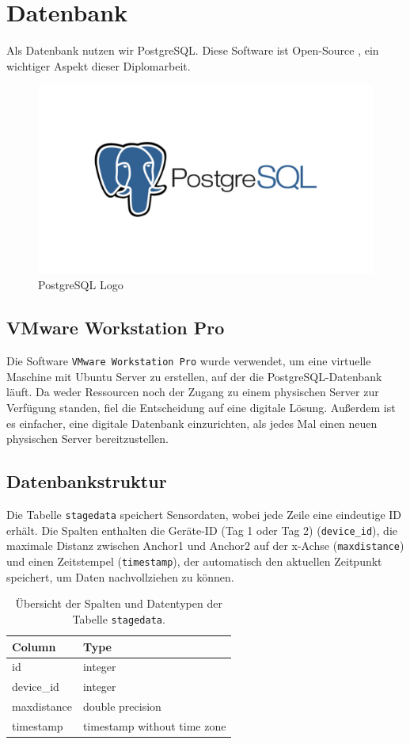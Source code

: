 \newpage
\section{Datenbank}
Als Datenbank nutzen wir PostgreSQL. Diese Software ist Open-Source \parencite{PostgreSQL}, ein wichtiger Aspekt dieser Diplomarbeit. 

\begin{figure}[H]
	\centering
	\includegraphics[width=0.5\linewidth]{images/postgres-logo.png}
	\caption[PostgreSQL Logo]{PostgreSQL Logo}
	\label{fig:PostgreSQLLogo}
\end{figure}

\subsection{VMware Workstation Pro}
Die Software \texttt{VMware Workstation Pro} wurde verwendet, um eine virtuelle Maschine mit Ubuntu Server zu erstellen, auf der die PostgreSQL-Datenbank läuft. Da weder Ressourcen noch der Zugang zu einem physischen Server zur Verfügung standen, fiel die Entscheidung auf eine digitale Lösung. Außerdem ist es einfacher, eine digitale Datenbank einzurichten, als jedes Mal einen neuen physischen Server bereitzustellen.

\subsection{Datenbankstruktur}
Die Tabelle \texttt{stagedata} speichert Sensordaten, wobei jede Zeile eine eindeutige ID erhält. Die Spalten enthalten die Geräte-ID (Tag 1 oder Tag 2) (\texttt{device\_id}), die maximale Distanz zwischen Anchor1 und Anchor2 auf der x-Achse (\texttt{maxdistance}) und einen Zeitstempel (\texttt{timestamp}), der automatisch den aktuellen Zeitpunkt speichert, um Daten nachvollziehen zu können.
\begin{table}[h]
	\centering
	\begin{tabular}{|l|l|}
		\hline
		\textbf{Column} & \textbf{Type} \\
		\hline
		id & integer \\
		\hline
		device\_id & integer \\
		\hline
		maxdistance & double precision \\
		\hline
		timestamp & timestamp without time zone \\
		\hline
	\end{tabular}
	\caption{Übersicht der Spalten und Datentypen der Tabelle \texttt{stagedata}.}
	\label{tab:stagedata}
\end{table}

